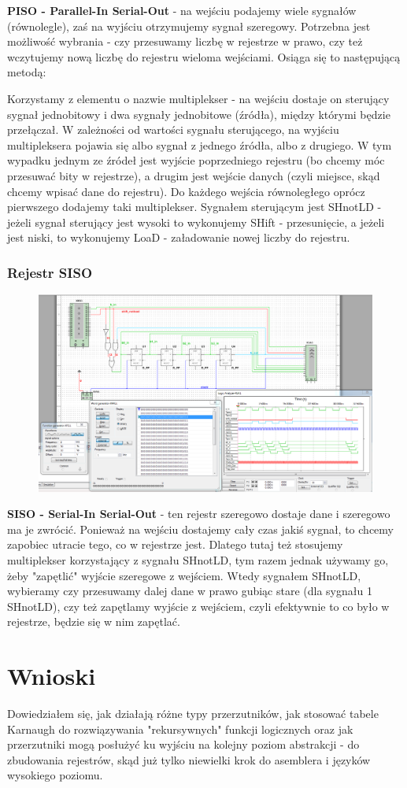 \documentclass[12pt,a4paper]{article}
\begin{document}
\textbf{PISO - Parallel-In Serial-Out} - na wejściu podajemy wiele sygnałów (równolegle), zaś na wyjściu otrzymujemy sygnał szeregowy. Potrzebna jest  możliwość wybrania - czy przesuwamy liczbę w rejestrze w prawo, czy też wczytujemy nową liczbę do rejestru wieloma wejściami. Osiąga się to następującą metodą:


Korzystamy z elementu o nazwie multiplekser - na wejściu dostaje on sterujący sygnał jednobitowy i dwa sygnały jednobitowe (źródła), między którymi będzie przełączał. W zależności od wartości sygnału sterującego, na wyjściu multipleksera pojawia się albo sygnał z jednego źródła, albo z drugiego. W tym wypadku jednym ze źródeł jest wyjście poprzedniego rejestru (bo chcemy móc przesuwać bity w rejestrze), a drugim jest wejście danych (czyli miejsce, skąd chcemy wpisać dane do rejestru). Do każdego wejścia równoległego oprócz pierwszego dodajemy taki multiplekser. Sygnałem sterującym jest SHnotLD - jeżeli sygnał sterujący jest wysoki to wykonujemy SHift - przesunięcie, a jeżeli jest niski, to wykonujemy LoaD - załadowanie nowej liczby do rejestru.

\subsubsection{Rejestr SISO}
\begin{figure}[H]
\centering
\includegraphics[width=\textwidth]{img/3hSISO}
\end{figure}

\textbf{SISO - Serial-In Serial-Out} - ten rejestr szeregowo dostaje dane i szeregowo ma je zwrócić. Ponieważ na wejściu dostajemy cały czas jakiś sygnał, to chcemy zapobiec utracie tego, co w rejestrze jest. Dlatego tutaj też stosujemy multiplekser korzystający z sygnału SHnotLD, tym razem jednak używamy go, żeby "zapętlić" wyjście szeregowe z wejściem. Wtedy sygnałem SHnotLD, wybieramy czy przesuwamy dalej dane w prawo gubiąc stare (dla sygnału 1 SHnotLD), czy też zapętlamy wyjście z wejściem, czyli efektywnie to co było w rejestrze, będzie się w nim zapętlać.


\section{Wnioski}
Dowiedziałem się, jak działają różne typy przerzutników, jak stosować tabele Karnaugh do rozwiązywania "rekursywnych" funkcji logicznych oraz jak przerzutniki mogą posłużyć ku wyjściu na kolejny poziom abstrakcji - do zbudowania rejestrów, skąd już tylko niewielki krok do asemblera i języków wysokiego poziomu.
\end{document}
